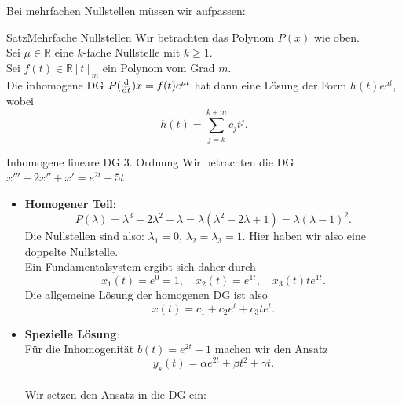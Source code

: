 Bei mehrfachen Nullstellen müssen wir aufpassen:
\begin{Satz}
{Satz}{Mehrfache Nullstellen}
Wir betrachten das Polynom $P(x)$ wie oben.\\
Sei $\mu\in\mathbb{R}$ eine $k$-fache Nullstelle mit $k\geq1$.\\
Sei $f(t)\in\mathbb{R}[t]_{m}$ ein Polynom vom Grad $m$.\\
Die inhomogene DG $P(\frac{\text{d}}{\text{d}t})x=f(t)e^{\mu t}$ hat dann eine Lösung der Form $h(t)e^{\mu t}$, wobei
\begin{equation*}
    h(t)=\sum_{j=k}^{k+m}c_jt^j.
\end{equation*}
\end{Satz}
\begin{Beispiel}{Inhomogene lineare DG 3. Ordnung}
Wir betrachten die DG $\boxed{x'''-2x''+x'=e^{2t}+5t}$.
\begin{itemize}
    \item \textbf{Homogener Teil}:
    \begin{equation*}
        P(\lambda)=\lambda^3-2\lambda^2+\lambda=\lambda(\lambda^2-2\lambda+1)=\lambda(\lambda-1)^2.
    \end{equation*}
    Die Nullstellen sind also: $\lambda_1=0,\,\lambda_2=\lambda_3=1$. Hier haben wir also eine doppelte Nullstelle.\\
    Ein Fundamentalsystem ergibt sich daher durch
    \begin{equation*}
        x_1(t)=e^0=1,\quad x_2(t)=e^{1t},\quad x_3(t)te^{1t}.
    \end{equation*}
    Die allgemeine Lösung der homogenen DG ist also
    \begin{equation*}
        x(t)=c_1+c_2e^t+c_3te^t.
    \end{equation*}
    \item \textbf{Spezielle Lösung}:\\
    Für die Inhomogenität $b(t)=e^{2t}+1$ machen wir den Ansatz
    \begin{equation*}
        y_s(t)=\alpha e^{2t}+\beta t^2+\gamma t.
    \end{equation*}
    \\
    Wir setzen den Ansatz in die DG ein:

\end{itemize}
\end{Beispiel}
